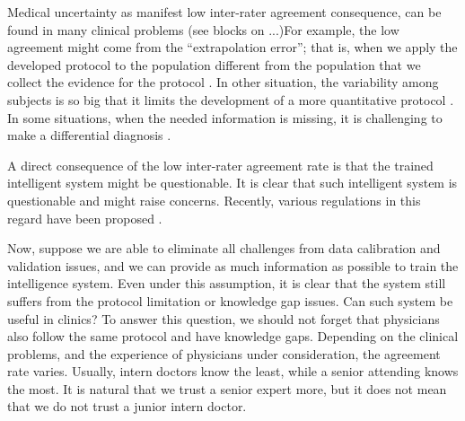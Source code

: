 \documentclass[11pt]{pnas-new}
\begin{document}
  Medical uncertainty as manifest low inter-rater agreement
  consequence, can be found in many clinical problems (see blocks on
  ...)For example, the low agreement might come from the
  ``extrapolation error''; that is, when we apply the developed
  protocol to the population different from the population that we
  collect the evidence for the protocol \cite{brosnan2015modest}.  In
  other situation, the variability among subjects is so big that it
  limits the development of a more quantitative protocol
  \cite{venhola2003interobserver}. In some situations, when the needed
  information is missing, it is challenging to make a differential
  diagnosis \cite{moncada2011reading}.

  A direct consequence of the low inter-rater agreement rate is that the trained intelligent system might be questionable. 
%  
It is clear that such intelligent system is questionable and might raise concerns. Recently, various regulations in this regard have been proposed \cite{price2014black,ford2016privacy}.


Now, suppose we are able to eliminate all challenges from data
calibration and validation issues, and we can provide as much
information as possible to train the intelligence system. Even under
this assumption, it is clear that the system still suffers from the
protocol limitation or knowledge gap issues. Can such system be useful
in clinics? To answer this question, we should not forget that
physicians also follow the same protocol and have knowledge
gaps. Depending on the clinical problems, and the experience of
physicians under consideration, the agreement rate varies. Usually,
intern doctors know the least, while a senior attending knows the
most. It is natural that we trust a senior expert more, but it does
not mean that we do not trust a junior intern doctor.
\end{document}
